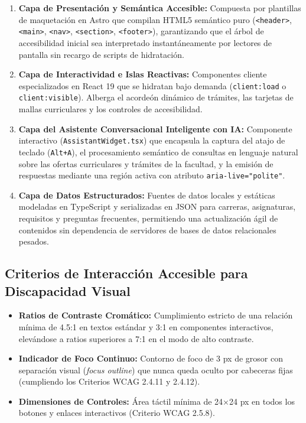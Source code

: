 \begin{enumerate}
  \item \textbf{Capa de Presentación y Semántica Accesible:} Compuesta por plantillas de maquetación en Astro que compilan HTML5 semántico puro (\texttt{<header>}, \texttt{<main>}, \texttt{<nav>}, \texttt{<section>}, \texttt{<footer>}), garantizando que el árbol de accesibilidad inicial sea interpretado instantáneamente por lectores de pantalla sin recargo de scripts de hidratación.
  \item \textbf{Capa de Interactividad e Islas Reactivas:} Componentes cliente especializados en React 19 que se hidratan bajo demanda (\texttt{client:load} o \texttt{client:visible}). Alberga el acordeón dinámico de trámites, las tarjetas de mallas curriculares y los controles de accesibilidad.
  \item \textbf{Capa del Asistente Conversacional Inteligente con IA:} Componente interactivo (\texttt{AssistantWidget.tsx}) que encapsula la captura del atajo de teclado (\texttt{Alt+A}), el procesamiento semántico de consultas en lenguaje natural sobre las ofertas curriculares y trámites de la facultad, y la emisión de respuestas mediante una región activa con atributo \texttt{aria-live="polite"}.
  \item \textbf{Capa de Datos Estructurados:} Fuentes de datos locales y estáticas modeladas en TypeScript y serializadas en JSON para carreras, asignaturas, requisitos y preguntas frecuentes, permitiendo una actualización ágil de contenidos sin dependencia de servidores de bases de datos relacionales pesados.
\end{enumerate}

\subsection{Criterios de Interacción Accesible para Discapacidad Visual}
\begin{itemize}
  \item \textbf{Ratios de Contraste Cromático:} Cumplimiento estricto de una relación mínima de 4.5:1 en textos estándar y 3:1 en componentes interactivos, elevándose a ratios superiores a 7:1 en el modo de alto contraste.
  \item \textbf{Indicador de Foco Continuo:} Contorno de foco de 3 px de grosor con separación visual (\textit{focus outline}) que nunca queda oculto por cabeceras fijas (cumpliendo los Criterios WCAG 2.4.11 y 2.4.12).
  \item \textbf{Dimensiones de Controles:} Área táctil mínima de 24$\times$24 px en todos los botones y enlaces interactivos (Criterio WCAG 2.5.8).
\end{itemize}

